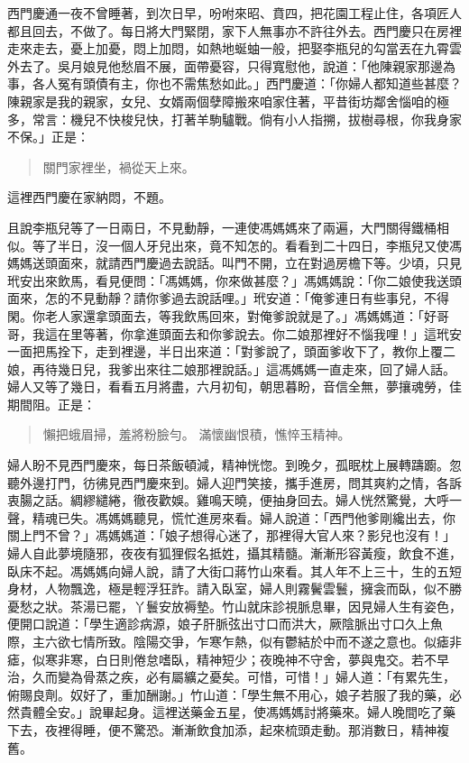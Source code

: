 西門慶通一夜不曾睡著，到次日早，吩咐來昭、賁四，把花園工程止住，各項匠人都且回去，不做了。每日將大門緊閉，家下人無事亦不許往外去。西門慶只在房裡走來走去，憂上加憂，悶上加悶，如熱地蜒蚰一般，把娶李瓶兒的勾當丟在九霄雲外去了。吳月娘見他愁眉不展，面帶憂容，只得寬慰他，說道：「他陳親家那邊為事，各人冤有頭債有主，你也不需焦愁如此。」西門慶道：「你婦人都知道些甚麼？陳親家是我的親家，女兒、女婿兩個孽障搬來咱家住著，平昔街坊鄰舍惱咱的極多，常言：機兒不快梭兒快，打著羊駒驢戰。倘有小人指搠，拔樹尋根，你我身家不保。」正是：
\begin{quote}
關門家裡坐，禍從天上來。
\end{quote}
這裡西門慶在家納悶，不題。

且說李瓶兒等了一日兩日，不見動靜，一連使馮媽媽來了兩遍，大門關得鐵桶相似。等了半日，沒一個人牙兒出來，竟不知怎的。看看到二十四日，李瓶兒又使馮媽媽送頭面來，就請西門慶過去說話。叫門不開，立在對過房檐下等。少頃，只見玳安出來飲馬，看見便問：「馮媽媽，你來做甚麼？」馮媽媽說：「你二娘使我送頭面來，怎的不見動靜？請你爹過去說話哩。」玳安道：「俺爹連日有些事兒，不得閑。你老人家還拿頭面去，等我飲馬回來，對俺爹說就是了。」馮媽媽道：「好哥哥，我這在里等著，你拿進頭面去和你爹說去。你二娘那裡好不惱我哩！」這玳安一面把馬拴下，走到裡邊，半日出來道：「對爹說了，頭面爹收下了，教你上覆二娘，再待幾日兒，我爹出來往二娘那裡說話。」這馮媽媽一直走來，回了婦人話。婦人又等了幾日，看看五月將盡，六月初旬，朝思暮盼，音信全無，夢攘魂勞，佳期間阻。正是：
\begin{quote}
懶把蛾眉掃，羞將粉臉勻。
滿懷幽恨積，憔悴玉精神。
\end{quote}

婦人盼不見西門慶來，每日茶飯頓減，精神恍惚。到晚夕，孤眠枕上展轉躊躕。忽聽外邊打門，彷彿見西門慶來到。婦人迎門笑接，攜手進房，問其爽約之情，各訴衷腸之話。綢繆繾綣，徹夜歡娛。雞鳴天曉，便抽身回去。婦人恍然驚覺，大呼一聲，精魂已失。馮媽媽聽見，慌忙進房來看。婦人說道：「西門他爹剛纔出去，你關上門不曾？」馮媽媽道：「娘子想得心迷了，那裡得大官人來？影兒也沒有！」婦人自此夢境隨邪，夜夜有狐狸假名抵姓，攝其精髓。漸漸形容黃瘦，飲食不進，臥床不起。馮媽媽向婦人說，請了大街口蔣竹山來看。其人年不上三十，生的五短身材，人物飄逸，極是輕浮狂詐。請入臥室，婦人則霧鬢雲鬟，擁衾而臥，似不勝憂愁之狀。茶湯已罷，丫鬟安放褥墊。竹山就床診視脈息畢，因見婦人生有姿色，便開口說道：「學生適診病源，娘子肝脈弦出寸口而洪大，厥陰脈出寸口久上魚際，主六欲七情所致。陰陽交爭，乍寒乍熱，似有鬱結於中而不遂之意也。似瘧非瘧，似寒非寒，白日則倦怠嗜臥，精神短少；夜晚神不守舍，夢與鬼交。若不早治，久而變為骨蒸之疾，必有屬纊之憂矣。可惜，可惜！」婦人道：「有累先生，俯賜良劑。奴好了，重加酬謝。」竹山道：「學生無不用心，娘子若服了我的藥，必然貴體全安。」說畢起身。這裡送藥金五星，使馮媽媽討將藥來。婦人晚間吃了藥下去，夜裡得睡，便不驚恐。漸漸飲食加添，起來梳頭走動。那消數日，精神複舊。

